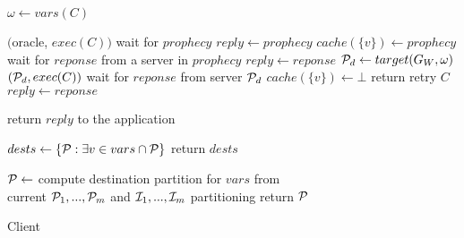 \begin{algorithm}[h!]
\small

\begin{distribalgo}[1]



\vspace{1.0mm}
	\STATE $\omega \leftarrow vars(C)$

		\STATE \amcast$($oracle, $exec(C))$
		\STATE wait for $prophecy$
			\STATE $reply \leftarrow prophecy$
			\STATE $cache(\{v\}) \leftarrow prophecy$
			\STATE wait for $reponse$ from a server in $prophecy$
			\STATE $reply \leftarrow reponse$
		\ENDIF
		\STATE $\mathcal{P}_d \leftarrow target(G_W, \omega)$
		\STATE \amcast$(\mathcal{P}_d, exec(C))$
		\STATE wait for $reponse$ from server $\mathcal{P}_d$
			\STATE $cache(\{v\}) \leftarrow \bot$
			\STATE return retry $C$
		\ELSE
			\STATE $reply \leftarrow reponse$
		\ENDIF	

	\ENDIF
\STATE return $reply$ to the application

\vspace{1.0mm}
	\STATE $dests \leftarrow \{ \mathcal{P} : \exists v \in vars \cap \mathcal{P} \}$
	\STATE return $dests$
\ENDINDENT

\vspace{1.0mm}
	\STATE $\mathcal{P} \leftarrow$ compute destination partition for $vars$ from\\ \hspace{8mm}current $\mathcal{P}_1, ..., \mathcal{P}_m$ and $\mathcal{I}_1, ..., \mathcal{I}_m$ partitioning
	\STATE return $\mathcal{P}$
\ENDINDENT	

\ENDINDENT

\caption{Client}
\label{alg:client_proxy}
\end{distribalgo}
\end{algorithm}